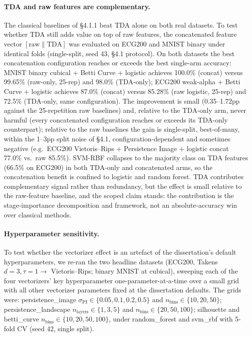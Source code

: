 \documentclass[12pt, a4paper]{report}
\theoremstyle{definition}
\theoremstyle{plain}
\theoremstyle{remark}
\begin{document}
\paragraph{TDA and raw features are complementary.} The classical
baselines of \S4.1.1 beat TDA alone on both real datasets. To test
whether TDA still adds value on top of raw features, the
concatenated feature vector $[\text{raw} \| \text{TDA}]$ was
evaluated on ECG200 and MNIST binary under identical folds
(single-split, seed 43, \S4.1 protocol). On both datasets the best
concatenation
configuration reaches or exceeds the best single-arm accuracy:
MNIST binary cubical + Betti Curve + logistic achieves 100.0\%
(concat) versus 99.65\% (raw-only, 25-rep) and 98.0\% (TDA-only);
ECG200 weak-alpha + Betti Curve + logistic achieves 87.0\% (concat)
versus 85.28\% (raw logistic, 25-rep) and 72.5\% (TDA-only, same
configuration). The improvement is small (0.35--1.72pp against the 25-repetition raw baselines)
and, relative to the TDA-only arm, never harmful (every concatenated
configuration reaches or exceeds its TDA-only counterpart); relative
to the raw baselines the gain is single-split, best-of-many, within
the 1--3pp split noise of \S4.1, configuration-dependent and
sometimes negative (e.g.\ ECG200 Vietoris--Rips + Persistence Image + logistic concat 77.0\% vs.\ raw
85.5\%). SVM-RBF collapses to the majority class on TDA features
(66.5\% on ECG200) in both TDA-only and concatenated arms, so the
concatenation benefit is confined to logistic and random forest.
TDA contributes complementary signal rather than
redundancy, but the effect is small relative to the raw-feature
baseline, and the scoped claim stands: the contribution is
the stage-importance decomposition and framework, not an
absolute-accuracy win over classical methods.

\paragraph{Hyperparameter sensitivity.}
To test whether the vectorizer effect is an artefact of the dissertation's
default hyperparameters, we re-ran the two headline datasets (ECG200, Takens
$d{=}3,\tau{=}1 \to$ Vietoris--Rips; binary MNIST at cubical),
sweeping each of the four vectorizers' key hyperparameter one-parameter-at-a-time
over a small grid with all other vectorizer parameters fixed at the dissertation
defaults. The grids were: persistence\_image $\sigma_{\mathrm{PI}} \in \{0.05,0.1,0.2,0.5\}$ and
$n_{\textrm{bins}} \in \{10,20,50\}$; persistence\_landscape
$n_{\textrm{layers}} \in \{1,3,5\}$ and $n_{\textrm{bins}} \in \{20,50,100\}$;
silhouette and betti\_curve $n_{\textrm{bins}} \in \{10,20,50,100\}$, under
random\_forest and svm\_rbf with 5-fold CV (seed 42, single split).
\end{document}
